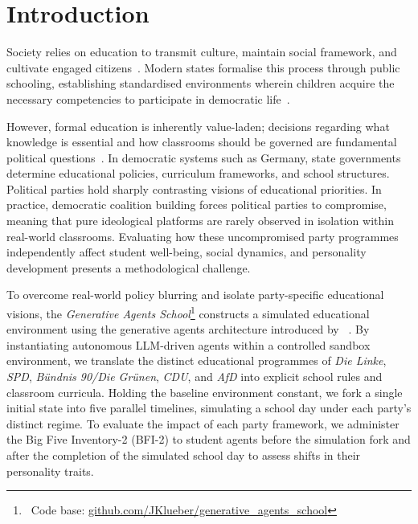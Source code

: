 \chapter{Introduction}
\label{introduction}

Society relies on education to transmit culture, maintain social framework, and cultivate engaged citizens~\cite{dewey:1916, bourdieu:1970}. Modern states formalise this process through public schooling, establishing standardised environments wherein children acquire the necessary competencies to participate in democratic life~\cite{dewey:1916}. 

However, formal education is inherently value-laden; decisions regarding what knowledge is essential and how classrooms should be governed are fundamental political questions~\cite{apple:2004}. 
In democratic systems such as Germany, state governments determine educational policies, curriculum frameworks, and school structures. 
Political parties hold sharply contrasting visions of educational priorities.
In practice, democratic coalition building forces political parties to compromise, meaning that pure ideological platforms are rarely observed in isolation within real-world classrooms. 
Evaluating how these uncompromised party programmes independently affect student well-being, social dynamics, and personality development presents a methodological challenge.

To overcome real-world policy blurring and isolate party-specific educational visions, the \textit{Generative Agents School}\footnote{\faGithub\ Code base: \href{https://github.com/JKlueber/generative_agents_school}{github.com/JKlueber/generative\_agents\_school}} constructs a simulated educational environment using the generative agents architecture introduced by~\citeauthor{park:2023} \cite{park:2023}. 
By instantiating autonomous LLM-driven agents within a controlled sandbox environment, we translate the distinct educational programmes of \textit{Die Linke}, \textit{SPD}, \textit{B\"undnis 90/Die Gr\"unen}, \textit{CDU}, and \textit{AfD} into explicit school rules and classroom curricula. 
Holding the baseline environment constant, we fork a single initial state into five parallel timelines, simulating a school day under each party's distinct regime. 
To evaluate the impact of each party framework, we administer the Big Five Inventory-2 (BFI-2) to student agents before the simulation fork and after the completion of the simulated school day to assess shifts in their personality traits.